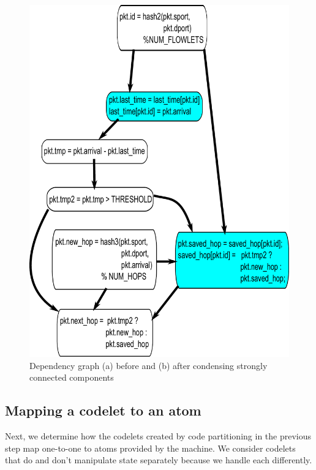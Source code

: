 \begin{figure}[!t]
\begin{minipage}{0.5\textwidth}
\includegraphics[width=\columnwidth]{scc.pdf}
\end{minipage}
\caption{Dependency graph (a) before and (b) after condensing strongly connected components}
\label{fig:partitioning}
\end{figure}

\subsection{Mapping a codelet to an atom}
\label{ss:code_gen}
Next, we determine how the codelets created by code partitioning in the
previous step map one-to-one to atoms provided by the \absmachine machine. We
consider codelets that do and don't manipulate state separately because we
handle each differently.

